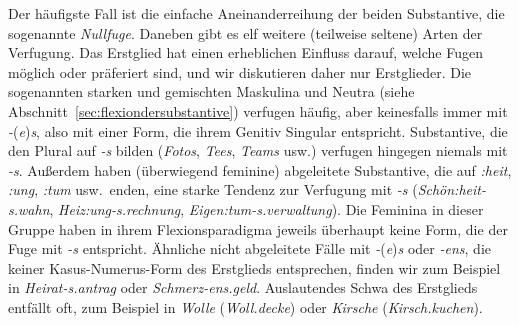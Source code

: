 Der häufigste Fall ist die einfache Aneinanderreihung der beiden Substantive, die sogenannte \textit{Nullfuge}.
Daneben gibt es elf weitere (teilweise seltene) Arten der Verfugung.
Das Erstglied hat einen erheblichen Einfluss darauf, welche Fugen möglich oder präferiert sind, und wir diskutieren daher nur Erstglieder.
Die sogenannten starken und gemischten Maskulina und Neutra (siehe Abschnitt~\ref{sec:flexiondersubstantive}) verfugen häufig, aber keinesfalls immer mit \textit{-}(\textit{e})\textit{s}, also mit einer Form, die ihrem Genitiv Singular entspricht.
Substantive, die den Plural auf \textit{-s} bilden (\textit{Fotos}, \textit{Tees}, \textit{Teams} usw.) verfugen hingegen niemals mit \textit{-s}.
Außerdem haben (überwiegend feminine) abgeleitete Substantive, die auf \textit{:heit}, \textit{:ung}, \textit{:tum} usw.\ enden, eine starke Tendenz zur Verfugung mit \textit{-s} (\zB \textit{Schön:heit-s.wahn}, \textit{Heiz:ung-s.rechnung}, \textit{Eigen:tum-s.verwaltung}).
Die Feminina in dieser Gruppe haben in ihrem Flexionsparadigma jeweils überhaupt keine Form, die der Fuge mit \textit{-s} entspricht.
Ähnliche nicht abgeleitete Fälle mit \textit{-}(\textit{e})\textit{s} oder \textit{-ens}, die keiner Kasus-Numerus-Form des Erstglieds entsprechen, finden wir zum Beispiel in \textit{Heirat-s.antrag} oder \textit{Schmerz-ens.geld}.
Auslautendes Schwa des Erstglieds entfällt oft, zum Beispiel in \textit{Wolle} (\textit{Woll.decke}) oder \textit{Kirsche} (\textit{Kirsch.kuchen}).

